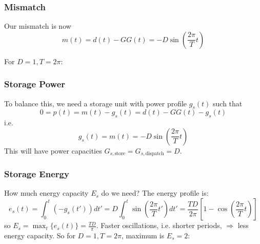 \documentclass[10pt,dvipsnames]{beamer}
\begin{document}
\begin{frame}
  \frametitle{Mismatch}

  Our mismatch is now
  \begin{equation*}
    m(t) = d(t) - G G(t) = -D\sin\left(\frac{2\pi}{T} t\right)
  \end{equation*}

  For $D =1, T = 2\pi$:


\end{frame}

\begin{frame}
  \frametitle{Storage Power}

  To balance this, we need a storage unit with power profile $g_s(t)$ such that
  \begin{equation*}
    0 = p(t) = m(t) - g_s(t) = d(t) - GG(t) - g_s(t)
  \end{equation*}
  i.e.
  \begin{equation*}
    g_s(t) = m(t) = -D\sin\left(\frac{2\pi}{T} t\right)
  \end{equation*}
  This will have power capacities $G_{s,\textrm{store}} = G_{s,\textrm{dispatch}} = D$.

\end{frame}


\begin{frame}
  \frametitle{Storage Energy}

  How much energy capacity $E_{s}$ do we need? The energy profile is:
  \begin{equation*}
    e_s(t) = \int_{0}^{t} (-g_s(t')) dt' = D \int_0^t \sin\left(\frac{2\pi}{T} t'\right) dt' =  \frac{TD}{2\pi}\left[ 1 - \cos\left(\frac{2\pi}{T} t\right)\right]
  \end{equation*}
  so $E_s = \max_t\{e_s(t)\} = \frac{TD}{\pi}$. Faster oscillations, i.e. shorter periods, $\Rightarrow$ less energy capacity. So for $D =1, T = 2\pi$, maximum is $E_s = 2$:


\end{frame}
\end{document}
